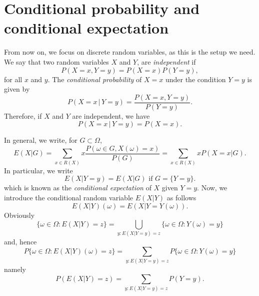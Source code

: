 \section{Conditional probability and conditional expectation}
From now on, we focus on discrete random variables, as this is the setup we need. We say that two random variables $X$ and $Y$, are \emph{independent} if
\begin{equation}
P(X=x, Y=y) = P(X=x) P(Y=y),
\end{equation}
for all $x$ and $y$.  The \emph{conditional probability} of
$X=x$ under the condition $Y=y$ is given by
\begin{equation}
P(X=x\,|\,Y=y) = \frac{P(X=x, Y=y)}{P(Y=y)}.
\end{equation}
Therefore, if $X$ and $Y$ are independent, we have
\begin{equation}\label{eqn:indep}
P(X=x\,|\,Y=y) = P(X=x).
\end{equation}

In general, we write, for $G \subset \Omega$,
\begin{equation}
E(X| G)
= \sum_{x \in R(X)} x \frac{P(\omega\in G, X(\omega)=x)}{P(G)}=
\sum_{x \in R(X)} x P(X=x|G).
\end{equation}
In particular, we write
\begin{equation}
E(X|Y=y)=E(X|G)
\mbox{ if }
G=\{Y=y\}.
\end{equation}
which is known as the \emph{conditional expectation} of $X$ given $Y =
y$.
Now, we introduce the conditional random variable $E(X|Y)$ as follows
\begin{equation}
E(X|Y)(\omega)=E(X|Y=Y(\omega)).
\end{equation}
Obviously
\begin{equation}
\{\omega\in \Omega: E(X|Y)=z\}=\bigcup_{y:  E(X|Y=y)=z}\{\omega\in \Omega:  Y(\omega)=y\}
\end{equation}
and, hence
\begin{equation}
P\{\omega\in \Omega:  E(X|Y) (\omega)=z\}=\sum_{y:   E(X|Y=y) =z}P\{\omega\in \Omega:  Y(\omega)=y\}
\end{equation}
namely
\begin{equation}
P( E(X|Y)=z)=\sum_{y:   E(X|Y=y)=z}P(Y=y).
\end{equation}

